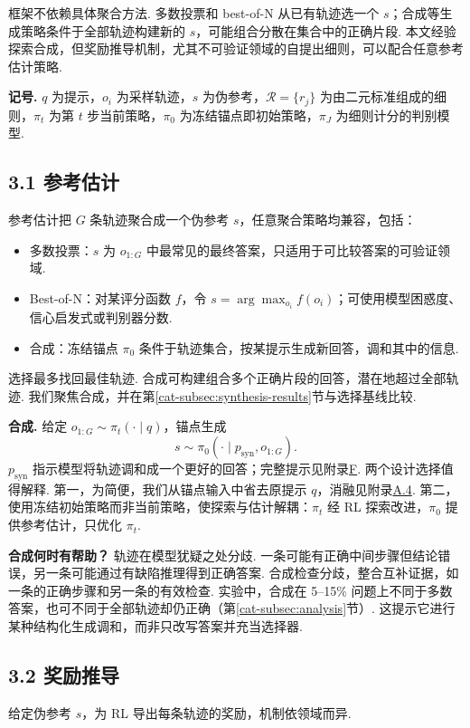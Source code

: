 框架不依赖具体聚合方法. 多数投票和 best-of-N 从已有轨迹选一个 $s$；合成等生成策略条件于全部轨迹构建新的 $s$，可能组合分散在集合中的正确片段. 本文经验探索合成，但奖励推导机制，尤其不可验证领域的自提出细则，可以配合任意参考估计策略.

\textbf{记号.} $q$ 为提示，$o_i$ 为采样轨迹，$s$ 为伪参考，$\mathcal R=\{r_j\}$ 为由二元标准组成的细则，$\pi_t$ 为第 $t$ 步当前策略，$\pi_0$ 为冻结锚点即初始策略，$\pi_J$ 为细则计分的判别模型.

\subsection*{3.1 参考估计}
参考估计把 $G$ 条轨迹聚合成一个伪参考 $s$，任意聚合策略均兼容，包括：
\begin{itemize}
\item 多数投票：$s$ 为 $o_{1:G}$ 中最常见的最终答案\cite{cat-zuo2025ttrl}，只适用于可比较答案的可验证领域.
\item Best-of-N：对某评分函数 $f$，令 $s=\arg\max_{o_i}f(o_i)$；可使用模型困惑度\cite{cat-agarwal2025unreasonable}、信心启发式\cite{cat-li2025confidence}或判别器分数.
\item 合成：冻结锚点 $\pi_0$ 条件于轨迹集合，按某提示生成新回答，调和其中的信息.
\end{itemize}
选择最多找回最佳轨迹. 合成可构建组合多个正确片段的回答，潜在地超过全部轨迹. 我们聚焦合成，并在第\ref{cat-subsec:synthesis-results}节与选择基线比较.

\textbf{合成.} 给定 $o_{1:G}\sim\pi_t(\cdot\mid q)$，锚点生成
\begin{equation}
s\sim\pi_0(\cdot\mid p_{\mathrm{syn}},o_{1:G}).\label{cat-eq:synthesis}
\end{equation}
$p_{\mathrm{syn}}$ 指示模型将轨迹调和成一个更好的回答；完整提示见附录\hyperref[cat-app:prompts]{F}. 两个设计选择值得解释. 第一，为简便，我们从锚点输入中省去原提示 $q$，消融见附录\hyperref[cat-app:omittingq]{A.4}. 第二，使用冻结初始策略而非当前策略，使探索与估计解耦：$\pi_t$ 经 RL 探索改进，$\pi_0$ 提供参考估计，只优化 $\pi_t$.

\textbf{合成何时有帮助？} 轨迹在模型犹疑之处分歧. 一条可能有正确中间步骤但结论错误，另一条可能通过有缺陷推理得到正确答案. 合成检查分歧，整合互补证据，如一条的正确步骤和另一条的有效检查. 实验中，合成在 5--15\% 问题上不同于多数答案，也可不同于全部轨迹却仍正确（第\ref{cat-subsec:analysis}节）. 这提示它进行某种结构化生成调和，而非只改写答案并充当选择器.

\subsection*{3.2 奖励推导}
给定伪参考 $s$，为 RL 导出每条轨迹的奖励，机制依领域而异.

